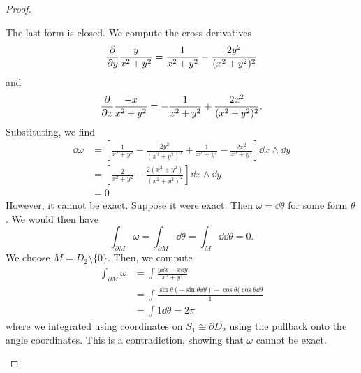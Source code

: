 \begin{proof}
\begin{parts}
		The last form is closed. We compute the cross derivatives
		\[
			\pdv{y} \frac{y}{x^2+y^2}= \frac{1}{x^2+y^2} - \frac{2y^2}{(x^2+y^2)^2}
		\] 
		and
		\[
			\pdv{x} \frac{-x}{x^2+y^2} = -\frac{1}{x^2+y^2} + \frac{2x^2}{(x^2+y^2)^2}
		.\] 
		Substituting, we find
		\begin{align*}
			\dd{\omega} &= \left[ \frac{1}{x^2+y^2} - \frac{2y^2}{(x^2+y^2)^2}+ \frac{1}{x^2+y^2} - \frac{2x^2}{x^2+y^2} \right] \dd{x}\wedge\dd{y}\\
				    &= \left[ \frac{2}{x^2+y^2}-\frac{2(x^2+y^2)}{(x^2+y^2)^2} \right]\dd{x}\wedge\dd{y}  \\
				    &= 0 
		\end{align*}
		However, it cannot be exact. Suppose it were exact. Then $\omega = \dd{\theta}$ for some form $\theta$. We would then have
		\[
		\int_{\partial M} \omega = \int_{\partial M} \dd{\theta} = \int_{M}\dd{\dd{\theta}} = 0
		.\] 
		We choose $M = D_2\setminus \{0\}  $. Then, we compute
		\begin{align*}
			\int_{\partial M}\omega &= \int \frac{y\dd{x}-x\dd{y}}{x^2+y^2} \\
						&= \int \frac{\sin \theta (-\sin\theta\dd{\theta}) - \cos\theta (\cos\theta\dd{\theta}}{1} \\
						&= \int 1\dd{\theta}=2\pi 
		\end{align*}
		where we integrated using coordinates on $S_1\cong \partial D_2$ using the pullback onto the angle coordinates. This is a contradiction, showing that $\omega$ cannot be exact.\qedhere
	\end{parts}
\end{proof}


